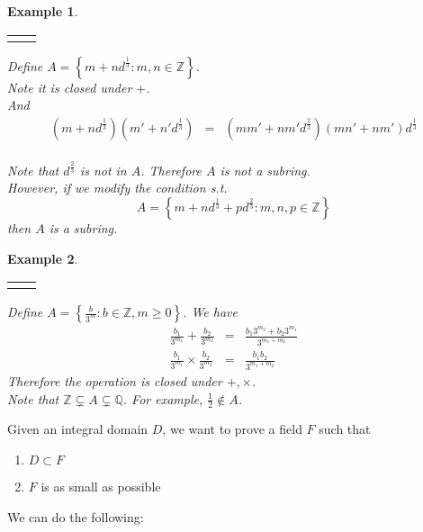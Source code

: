 \documentclass{article}
\theoremstyle{MyNonumberplain}
\theoremstyle{break}
\newcommand{\nline}{\begin{tabular}{ll}&\\\end{tabular}}
\newcommand{\nin}{\not\in}
\theoremstyle{break}
\newtheorem{example}{Example}[section]
\theoremstyle{break}
\theoremstyle{definition}
\theoremstyle{break}
\begin{document}
\begin{expbox}
    \begin{example}

        \nline

        Define $A = \left\{ m + n d^{\frac{1}{3}} : m, n \in \mathbb{Z} \right\}$.\\

        Note it is closed under $+$.\\
        
        And
        \begin{eqnarray*}
          \left( m + n d^{\frac{1}{3}} \right) \left( m' + n' d^{\frac{1}{3}} \right)
          & = & \left( m m' + n m' d^{\frac{2}{3}} \right) (m n' + n m')
          d^{\frac{1}{3}}
        \end{eqnarray*}\\
        Note that $d^{\frac{2}{3}}$ is not in $A$. Therefore $A$ is not a subring.\\

        However, if we modify the condition s.t.
        \[ A = \left\{ m + n d^{\frac{1}{3}} + p d^{\frac{2}{3}} : m, n, p \in
           \mathbb{Z} \right\} \]
        then $A$ is a subring.
    \end{example}
\end{expbox}

\begin{expbox}
    \begin{example} 

        \nline

        Define $A = \left\{ \frac{b}{3^m} : b \in \mathbb{Z}, m \geq 0 \right\}$. We
        have
        \begin{eqnarray*}
        \frac{b_1}{3^{m_1}} + \frac{b_2}{3^{m_2}} & = & \frac{b_1 3^{m_2} + b_2
        3^{m_1}}{3^{m_1 + m_2}}\\
        \frac{b_1}{3^{m_1}} \times \frac{b_2}{3^{m_2}} & = & \frac{b_1 b_2}{3^{m_1 +
        m_2}}
        \end{eqnarray*}
        Therefore the operation is closed under $+, \times$.\\

        Note that $\mathbb{Z} \subsetneq A \subsetneq \mathbb{Q}$. For example,
        $\frac{1}{2} \nin A$.
    \end{example}
\end{expbox}

Given an integral domain $D$, we want to prove a field $F$ such that
\begin{enumerate}
  \item $D \subset F$
  
  \item $F$ is as small as possible
\end{enumerate}
We can do the following:
\end{document}
